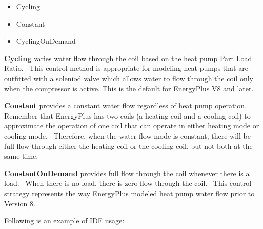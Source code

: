\begin{itemize}
\item
  Cycling
\item
  Constant
\item
  CyclingOnDemand
\end{itemize}

\textbf{Cycling} varies water flow through the coil based on the heat pump Part Load Ratio.~ This control method is appropriate for modeling heat pumps that are outfitted with a soleniod valve which allows water to flow through the coil only when the compressor is active. This is the default for EnergyPlus V8 and later.

\textbf{Constant} provides a constant water flow regardless of heat pump operation.~ Remember that EnergyPlus has two coils (a heating coil and a cooling coil) to approximate the operation of one coil that can operate in either heating mode or cooling mode.~ Therefore, when the water flow mode is constant, there will be full flow through either the heating coil or the cooling coil, but not both at the same time.

\textbf{ConstantOnDemand} provides full flow through the coil whenever there is a load.~ When there is no load, there is zero flow through the coil.~ This control strategy represents the way EnergyPlus modeled heat pump water flow prior to Version 8.

Following is an example of IDF usage:

